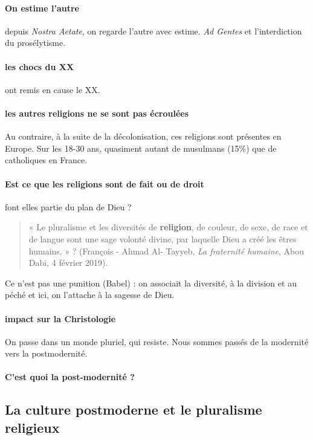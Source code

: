 \paragraph{On estime l'autre} depuis\textit{ Nostra Aetate}, on regarde l'autre avec estime. \textit{Ad Gentes} et l'interdiction du prosélytisme. 

 \paragraph{les chocs du XX} ont remis en cause le XX.

 \paragraph{les autres religions ne se sont pas écroulées} Au contraire, à la suite de la décolonisation, ces religions sont présentes en Europe. Sur les 18-30 ans, quasiment autant de musulmans (15\%) que de catholiques en France.

 \paragraph{Est ce que les religions sont de fait ou de droit} font elles partie du plan de Dieu ?
\begin{quote}
     « Le pluralisme et les diversités de \textbf{religion}, de couleur, de sexe, de race et de langue sont une
sage volonté divine, par laquelle Dieu a créé les êtres humains. » ? (François - Ahmad Al-
Tayyeb, \textit{La fraternité humaine}, Abou Dabi, 4 février 2019).
\end{quote}
 Ce n'est pas une punition (Babel) : on associait la diversité, à la division et au péché et ici, on l'attache à la sagesse de Dieu.

\paragraph{impact sur la Christologie} On passe dans un monde pluriel, qui resiste. Nous sommes passés de la modernité vers la postmodernité.

\paragraph{C'est quoi la post-modernité ? }
 
\subsection{La culture postmoderne et le pluralisme religieux}

